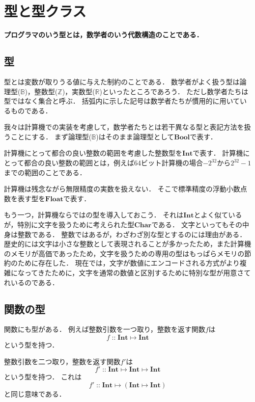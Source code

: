 \documentclass[twocolumn]{jsbook}
\newenvironment{leader}{\begingroup\bf}{\endgroup}
\newcommand{\typename}[1]{\mathbf{#1}}
\newcommand{\typebool}{\typename{Bool}}
\newcommand{\typechar}{\typename{Char}}
\newcommand{\typeint}{\typename{Int}}
\newcommand{\typefloat}{\typename{Float}}
\newcommand{\morph}[2]{#1\mapsto#2}
\newcommand{\mmorph}[3]{#1\mapsto#2\mapsto#3}
\newcommand{\mmorphwithparenthesis}[3]{#1\mapsto(#2\mapsto#3)}
\newcommand{\istypeof}{\mathop{::}}
\newcommand{\mathsetname}[1]{\mathbb{#1}}
\begin{document}
\chapter{型と型クラス}

\begin{leader}
プログラマのいう型とは，数学者のいう代数構造のことである．
\end{leader}


\section{型}

型とは変数が取りうる値に与えた制約のことである．
数学者がよく扱う型は論理型($\mathsetname{B}$)，整数型($\mathsetname{Z}$)，実数型($\mathsetname{R}$)といったところであろう．
ただし数学者たちは型ではなく集合と呼ぶ．
括弧内に示した記号は数学者たちが慣用的に用いているものである．

我々は計算機での実装を考慮して，数学者たちとは若干異なる型と表記方法を扱うことにする．
まず論理型($\mathsetname{B}$)はそのまま論理型として$\typebool$で表す．

計算機にとって都合の良い整数の範囲を考慮した整数型を$\typeint$で表す．
計算機にとって都合の良い整数の範囲とは，例えば64ビット計算機の場合$-2^{32}$から$2^{32}-1$までの範囲のことである．

計算機は残念ながら無限精度の実数を扱えない．
そこで標準精度の浮動小数点数を表す型を$\typefloat$で表す．

もう一つ，計算機ならではの型を導入しておこう．
それは$\typeint$とよく似ているが，特別に文字を扱うために考えられた型$\typechar$である．
文字といってもその中身は整数である．
整数ではあるが，わざわざ別な型とするのには理由がある．
歴史的には文字は小さな整数として表現されることが多かったため，また計算機のメモリが高価であったため，文字を扱うための専用の型はもっぱらメモリの節約のために存在した．
現在では，文字が数値にエンコードされる方式がより複雑になってきたために，文字を通常の数値と区別するために特別な型が用意さてれいるのである．


\section{関数の型}

関数にも型がある．
例えば整数引数を一つ取り，整数を返す関数$f$は$$f\istypeof\morph{\typeint}{\typeint}$$という型を持つ．

整数引数を二つ取り，整数を返す関数$f'$は$$f'\istypeof\mmorph{\typeint}{\typeint}{\typeint}$$という型を持つ．
これは$$f'\istypeof\mmorphwithparenthesis{\typeint}{\typeint}{\typeint}$$と同じ意味である．
\end{document}
